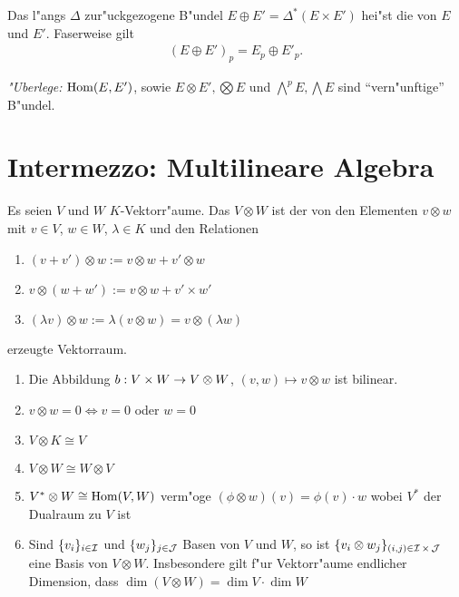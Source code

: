 \begin{center}\end{center}

Das l"angs $\Delta$ zur"uckgezogene B"undel $E \oplus E' = \Delta^{\ast}(E \times E')$ hei"st die  von $E$ und $E'$.
Faserweise gilt
\begin{align*}
  (E \oplus E')_p = E_p \oplus E'_p.
\end{align*}
 
\emph{"Uberlege:} $\operatorname{Hom}(E,E')$, sowie $E \otimes E', \bigotimes E$ und $\bigwedge^pE, \bigwedge E$ sind "`vern"unftige"' B"undel.


\section{Intermezzo: Multilineare Algebra}

Es seien $V$ und $W$ $K$-Vektorr"aume. Das  $V \otimes W$ ist der von den Elementen $v \otimes w$ mit $v \in V$, $w \in W$, $\lambda \in K$ und den Relationen
\begin{enumerate}[label=(\roman*),widest=iii]
\item
	$(v + v') \otimes w := v \otimes w + v' \otimes w$
\item
	$v \otimes (w + w') := v \otimes w + v' \times w'$
\item
	$(\lambda v) \otimes w := \lambda (v \otimes w) = v \otimes (\lambda w)$
\end{enumerate} erzeugte Vektorraum.

\begin{emptythm}[Eigenschaften:]
\begin{enumerate}[label=(\arabic*),leftmargin=*]
\item Die Abbildung $b: V \times W \to V \otimes W$, $(v, w) \mapsto v \otimes w$ ist bilinear.
\item $v \otimes w = 0 \Leftrightarrow v = 0$ oder $w = 0$
\item $V \otimes K \cong V$
\item $V \otimes W \cong W \otimes V$
\item $V^* \otimes W \cong \operatorname{Hom}(V, W)$ verm"oge $(\phi \otimes w)(v) = \phi(v) \cdot w$ wobei $V^*$ der \gls{Dualraum} zu $V$ ist
\item Sind $\{v_i\}_{i \in \operatorname{\mathcal{I}}}$ und $\{w_j\}_{j \in \operatorname{\mathcal{J}}}$ Basen von $V$ und $W$, so ist $\{v_i \otimes w_j\}_{(i,j) \in \operatorname{\mathcal{I}} \times \operatorname{\mathcal{J}}}$ eine Basis von $V \otimes W$. Insbesondere gilt f"ur Vektorr"aume endlicher Dimension, dass $\dim (V \otimes W) = \dim V \cdot \dim W$
\end{enumerate}
\end{emptythm}

